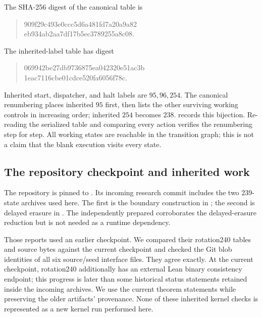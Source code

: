The SHA-256 digest of the canonical table is
\begin{quote}\small\ttfamily
909f29c493e0ccc5d6a481fd7a20a9a82\\
eb934ab2aa7df17b5ec3789255a8c08.
\end{quote}
The inherited-label table  has digest
\begin{quote}\small\ttfamily
069942be27db9736875ea042320e51ac3b\\
1eac7116cbe01cdce520fa6056f78c.
\end{quote}
Inherited start, dispatcher, and halt labels are $95,96,254$. The canonical
renumbering places inherited $95$ first, then lists the other surviving
working controls in increasing order; inherited $254$ becomes $238$.
 records this bijection. Re-reading the
serialized table and comparing every action verifies the renumbering
step for step. All working states are reachable in the transition graph;
this is not a claim that the blank execution visits every state.

\subsection{The repository checkpoint and inherited work}

The repository is pinned to
. Its incoming research commit
 includes the two 239-state
archives used here. The first is the boundary construction in
; the second is delayed
erasure in . The independently prepared
 corroborates the delayed-erasure
reduction but is not needed as a runtime dependency.\cite{boundary239,companion239}

Those reports used an earlier checkpoint. We compared their rotation240
tables and source bytes against the current checkpoint and checked the
Git blob identities of all six source/seed interface files. They agree
exactly. At the current checkpoint, rotation240 additionally has an
external Lean binary consistency endpoint; this progress is later than
some historical status statements retained inside the incoming archives.
We use the current theorem statements while preserving the older
artifacts' provenance.\cite{proveit240,calibration}
None of these inherited kernel checks is
represented as a new kernel run performed here.

